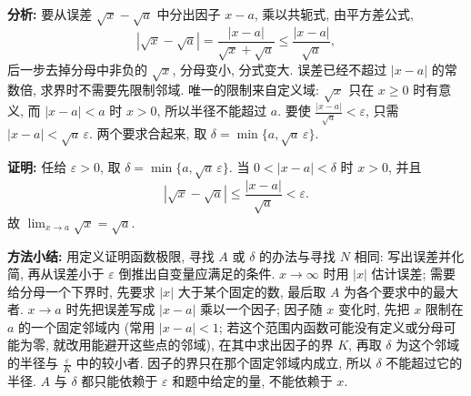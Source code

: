 \documentclass[UTF8,openany]{ctexbook}
\theoremstyle{chinesetextbook}
\newenvironment{cnproof}{\par\indent\textbf{证明:} \ignorespaces}{\par}
\begin{document}
\par\indent\textbf{分析:} 要从误差 $\sqrt x-\sqrt a$ 中分出因子 $x-a$, 乘以共轭式, 由平方差公式,
\[
|\sqrt x-\sqrt a|=\frac{|x-a|}{\sqrt x+\sqrt a}\le\frac{|x-a|}{\sqrt a},
\]
后一步去掉分母中非负的 $\sqrt x$, 分母变小, 分式变大. 误差已经不超过 $|x-a|$ 的常数倍, 求界时不需要先限制邻域. 唯一的限制来自定义域: $\sqrt x$ 只在 $x\ge0$ 时有意义, 而 $|x-a|<a$ 时 $x>0$, 所以半径不能超过 $a$. 要使 $\displaystyle\frac{|x-a|}{\sqrt a}<\varepsilon$, 只需 $|x-a|<\sqrt a\,\varepsilon$. 两个要求合起来, 取 $\delta=\min\{a,\sqrt a\,\varepsilon\}$.
\begin{cnproof}
任给 $\varepsilon>0$, 取 $\delta=\min\{a,\sqrt a\,\varepsilon\}$. 当 $0<|x-a|<\delta$ 时 $x>0$, 并且
\[
|\sqrt x-\sqrt a|\le\frac{|x-a|}{\sqrt a}<\varepsilon.
\]
故 $\displaystyle\lim_{x\to a}\sqrt x=\sqrt a$.
\end{cnproof}
\par\indent\textbf{方法小结:} 用定义证明函数极限, 寻找 $A$ 或 $\delta$ 的办法与寻找 $N$ 相同: 写出误差并化简, 再从误差小于 $\varepsilon$ 倒推出自变量应满足的条件. $x\to\infty$ 时用 $|x|$ 估计误差; 需要给分母一个下界时, 先要求 $|x|$ 大于某个固定的数, 最后取 $A$ 为各个要求中的最大者. $x\to a$ 时先把误差写成 $|x-a|$ 乘以一个因子; 因子随 $x$ 变化时, 先把 $x$ 限制在 $a$ 的一个固定邻域内 (常用 $|x-a|<1$; 若这个范围内函数可能没有定义或分母可能为零, 就改用能避开这些点的邻域), 在其中求出因子的界 $K$, 再取 $\delta$ 为这个邻域的半径与 $\displaystyle\frac\varepsilon K$ 中的较小者. 因子的界只在那个固定邻域内成立, 所以 $\delta$ 不能超过它的半径. $A$ 与 $\delta$ 都只能依赖于 $\varepsilon$ 和题中给定的量, 不能依赖于 $x$.
\end{document}
